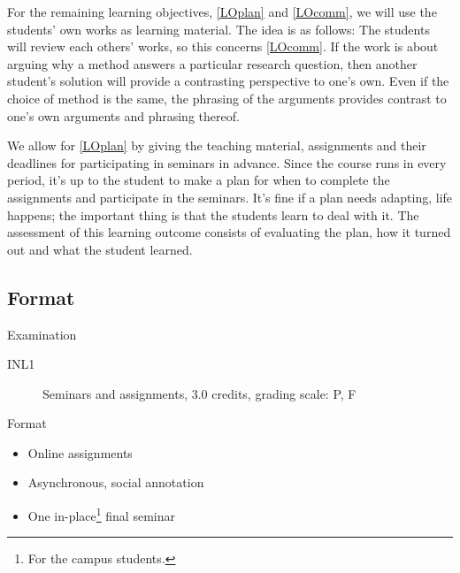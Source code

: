 For the remaining learning objectives, \ref{LOplan} and \ref{LOcomm}, we will 
use the students' own works as learning material.
The idea is as follows:
The students will review each others' works, so this concerns \ref{LOcomm}.
If the work is about arguing why a method answers a particular research 
question, then another student's solution will provide a contrasting 
perspective to one's own.
Even if the choice of method is the same, the phrasing of the arguments 
provides contrast to one's own arguments and phrasing thereof.

We allow for \ref{LOplan} by giving the teaching material, assignments and 
their deadlines for participating in seminars in advance.
Since the course runs in every period, it's up to the student to make a plan 
for when to complete the assignments and participate in the seminars.
It's fine if a plan needs adapting, life happens; the important thing is that 
the students learn to deal with it.
The assessment of this learning outcome consists of evaluating the plan, how it 
turned out and what the student learned.

\subsection{Format}

\begin{frame}[fragile]
  \begin{block}{Examination}
    \begin{description}
      \item[INL1] Seminars and assignments, 3.0 credits, grading scale: P, F
    \end{description}
  \end{block}

  \pause

  \begin{block}{Format}
    \begin{itemize}
      \item Online assignments
      \item Asynchronous, social annotation
      \item One in-place\footnote{%
          For the campus students.
        } final seminar
    \end{itemize}
  \end{block}
\end{frame}

